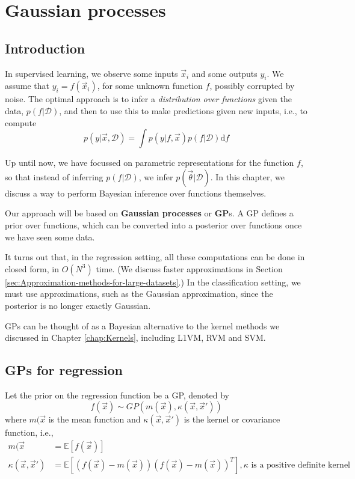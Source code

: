 \chapter{Gaussian processes}


\section{Introduction}
In supervised learning, we observe some inputs $\vec{x}_i$ and some outputs $y_i$. We assume that $y_i =f(\vec{x}_i)$, for some unknown function $f$, possibly corrupted by noise. The optimal approach is to infer a \emph{distribution over functions} given the data, $p(f|\mathcal{D})$, and then to use this to make predictions given new inputs, i.e., to compute
\begin{equation}
p(y|\vec{x},\mathcal{D})=\int p(y|f,\vec{x})p(f|\mathcal{D})\mathrm{d}f
\end{equation}

Up until now, we have focussed on parametric representations for the function $f$, so that instead of inferring $p(f|\mathcal{D})$, we infer $p(\vec{\theta}|\mathcal{D})$. In this chapter, we discuss a way to perform Bayesian inference over functions themselves.

Our approach will be based on \textbf{Gaussian processes} or \textbf{GP}s. A GP defines a prior over functions, which can be converted into a posterior over functions once we have seen some data. 

It turns out that, in the regression setting, all these computations can be done in closed form, in $O(N^3)$ time. (We discuss faster approximations in Section \ref{sec:Approximation-methods-for-large-datasets}.) In the classification setting, we must use approximations, such as the Gaussian approximation, since the posterior is no longer exactly Gaussian.

GPs can be thought of as a Bayesian alternative to the kernel methods we discussed in Chapter \ref{chap:Kernels}, including L1VM, RVM and SVM.


\section{GPs for regression}
Let the prior on the regression function be a GP, denoted by
\begin{equation}
f(\vec{x}) \sim GP(m(\vec{x}),\kappa(\vec{x},\vec{x}'))
\end{equation}
where $m(\vec{x}$ is the mean function and $\kappa(\vec{x},\vec{x}')$ is the kernel or covariance function, i.e.,
\begin{align}
m(\vec{x} & = \mathbb{E}[f(\vec{x})] \\
\kappa(\vec{x},\vec{x}') & = \mathbb{E}[(f(\vec{x})-m(\vec{x}))(f(\vec{x})-m(\vec{x}))^T], \kappa \text{ is a positive definite kernel}
\end{align}


